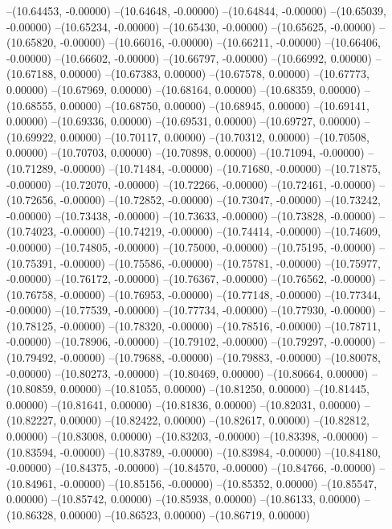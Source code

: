 --(10.64453, -0.00000)
--(10.64648, -0.00000)
--(10.64844, -0.00000)
--(10.65039, -0.00000)
--(10.65234, -0.00000)
--(10.65430, -0.00000)
--(10.65625, -0.00000)
--(10.65820, -0.00000)
--(10.66016, -0.00000)
--(10.66211, -0.00000)
--(10.66406, -0.00000)
--(10.66602, -0.00000)
--(10.66797, -0.00000)
--(10.66992, 0.00000)
--(10.67188, 0.00000)
--(10.67383, 0.00000)
--(10.67578, 0.00000)
--(10.67773, 0.00000)
--(10.67969, 0.00000)
--(10.68164, 0.00000)
--(10.68359, 0.00000)
--(10.68555, 0.00000)
--(10.68750, 0.00000)
--(10.68945, 0.00000)
--(10.69141, 0.00000)
--(10.69336, 0.00000)
--(10.69531, 0.00000)
--(10.69727, 0.00000)
--(10.69922, 0.00000)
--(10.70117, 0.00000)
--(10.70312, 0.00000)
--(10.70508, 0.00000)
--(10.70703, 0.00000)
--(10.70898, 0.00000)
--(10.71094, -0.00000)
--(10.71289, -0.00000)
--(10.71484, -0.00000)
--(10.71680, -0.00000)
--(10.71875, -0.00000)
--(10.72070, -0.00000)
--(10.72266, -0.00000)
--(10.72461, -0.00000)
--(10.72656, -0.00000)
--(10.72852, -0.00000)
--(10.73047, -0.00000)
--(10.73242, -0.00000)
--(10.73438, -0.00000)
--(10.73633, -0.00000)
--(10.73828, -0.00000)
--(10.74023, -0.00000)
--(10.74219, -0.00000)
--(10.74414, -0.00000)
--(10.74609, -0.00000)
--(10.74805, -0.00000)
--(10.75000, -0.00000)
--(10.75195, -0.00000)
--(10.75391, -0.00000)
--(10.75586, -0.00000)
--(10.75781, -0.00000)
--(10.75977, -0.00000)
--(10.76172, -0.00000)
--(10.76367, -0.00000)
--(10.76562, -0.00000)
--(10.76758, -0.00000)
--(10.76953, -0.00000)
--(10.77148, -0.00000)
--(10.77344, -0.00000)
--(10.77539, -0.00000)
--(10.77734, -0.00000)
--(10.77930, -0.00000)
--(10.78125, -0.00000)
--(10.78320, -0.00000)
--(10.78516, -0.00000)
--(10.78711, -0.00000)
--(10.78906, -0.00000)
--(10.79102, -0.00000)
--(10.79297, -0.00000)
--(10.79492, -0.00000)
--(10.79688, -0.00000)
--(10.79883, -0.00000)
--(10.80078, -0.00000)
--(10.80273, -0.00000)
--(10.80469, 0.00000)
--(10.80664, 0.00000)
--(10.80859, 0.00000)
--(10.81055, 0.00000)
--(10.81250, 0.00000)
--(10.81445, 0.00000)
--(10.81641, 0.00000)
--(10.81836, 0.00000)
--(10.82031, 0.00000)
--(10.82227, 0.00000)
--(10.82422, 0.00000)
--(10.82617, 0.00000)
--(10.82812, 0.00000)
--(10.83008, 0.00000)
--(10.83203, -0.00000)
--(10.83398, -0.00000)
--(10.83594, -0.00000)
--(10.83789, -0.00000)
--(10.83984, -0.00000)
--(10.84180, -0.00000)
--(10.84375, -0.00000)
--(10.84570, -0.00000)
--(10.84766, -0.00000)
--(10.84961, -0.00000)
--(10.85156, -0.00000)
--(10.85352, 0.00000)
--(10.85547, 0.00000)
--(10.85742, 0.00000)
--(10.85938, 0.00000)
--(10.86133, 0.00000)
--(10.86328, 0.00000)
--(10.86523, 0.00000)
--(10.86719, 0.00000)
